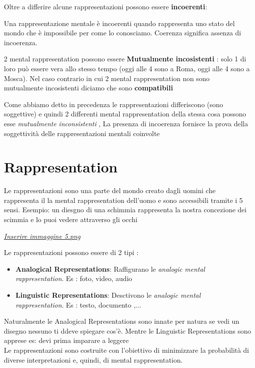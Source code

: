 \documentclass [12pt, letterpaper]{article}
\begin{document}
	
	Oltre a differire alcune rappresentazioni possono essere \textbf{incoerenti}:

	Una rappresentazione mentale è incoerenti quando rappresenta uno stato del mondo che è impossibile per come lo conosciamo. Coerenza significa assenza di incoerenza.
	
	2 mental rappresentation possono essere \textbf{Mutualmente incosistenti} : 
	solo 1 di loro può essere vera allo stesso tempo (oggi alle 4 sono a Roma, oggi alle 4 sono a Mosca). Nel caso contrario in cui 2 mental rappresentation non sono mutualmente incosistenti diciamo che sono \textbf{compatibili}
	
	
	Come abbiamo detto in precedenza le rappresentazioni differiscono (sono soggettive) e quindi 2 differenti mental rappresentation della stessa cosa possono esse \textit{mutualmente inconsistenti} , La presenza di incoerenza fornisce la prova della soggettività
	delle rappresentazioni mentali coinvolte
	
	
	\section{Rappresentation}
	
	Le rappresentazioni sono una parte del mondo creato dagli uomini che rappresenta il la mental rappresentation dell'uomo e sono accessibili tramite i 5 sensi. Esempio: un diesgno di una schimmia rappresenta la nostra concezione dei scimmia e lo puoi vedere attraverso gli occhi 
	
	\underline{\textit{Inserire immaggine 5.png }}
	
	Le rappresentazioni possono essere di 2 tipi :
	
	\begin{itemize}
		\item \textbf{Analogical Representations}: 
			Raffigurano le \textit{analogic mental rappresentation}. Es : foto, video, audio
			
		\item \textbf{Linguistic Representations}: 
		Desctivono le \textit{analogic mental rappresentation}. Es : testo, documento ,...		
	\end{itemize}

Naturalmente le Analogical Representations sono innate per natura se vedi un disegno nessuno ti ddeve spiegare cos'è. Mentre le Linguistic Representations sono apprese es: devi prima imparare a leggere 
\\

Le rappresentazioni sono costruite con l'obiettivo di minimizzare la probabilità di diverse interpretazioni e, quindi, di mental rappresentation.
\end{document}
